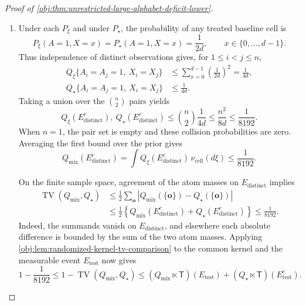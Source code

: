 \documentclass[11pt]{article}
\begin{document}
\begin{proof}[Proof of \cref{obj:thm:unrestricted-large-alphabet-deficit-lower}]
\begin{enumerate}
\item Under each \(P_\xi\) and under \(P_\star\), the probability of any treated baseline cell is
\[
P_\xi(A=1,X=x)=P_\star(A=1,X=x)=\frac1{2d},
\qquad x\in\{0,\ldots,d-1\}.
\]
Thus independence of distinct observations gives, for \(1\le i<j\le n\),
\[
\begin{aligned}
Q_\xi\{A_i=A_j=1,\ X_i=X_j\}
&\le
\sum_{x=0}^{d-1}\left(\frac1{2d}\right)^2
=\frac1{4d},
\\
Q_\star\{A_i=A_j=1,\ X_i=X_j\}
&\le\frac1{4d}.
\end{aligned}
\]
Taking a union over the \(\binom n2\) pairs yields
\[
Q_\xi(E_{\mathrm{distinct}}^c),
\ Q_\star(E_{\mathrm{distinct}}^c)
\le
\binom n2\frac1{4d}
\le\frac{n^2}{8d}
\le\frac1{8192}.
\]
When \(n=1\), the pair set is empty and these collision probabilities are zero. Averaging the first bound over the prior gives
\[
Q_{\mathrm{mix}}(E_{\mathrm{distinct}}^c)
=
\int Q_\xi(E_{\mathrm{distinct}}^c)\,
\nu_{\mathrm{cell}}(d\xi)
\le\frac1{8192}.
\]

On the finite sample space, agreement of the atom masses on
\(E_{\mathrm{distinct}}\) implies
\[
\begin{aligned}
\operatorname{TV}(Q_{\mathrm{mix}},Q_\star)
&\le
\frac12\sum_{\mathbf o}
\left|Q_{\mathrm{mix}}(\{\mathbf o\})
-Q_\star(\{\mathbf o\})\right|
\\
&\le
\frac12\left\{
Q_{\mathrm{mix}}(E_{\mathrm{distinct}}^c)
+Q_\star(E_{\mathrm{distinct}}^c)
\right\}
\le\frac1{8192}.
\end{aligned}
\]
Indeed, the summands vanish on \(E_{\mathrm{distinct}}\), and elsewhere each absolute difference is bounded by the sum of the two atom masses. Applying
\cref{obj:lem:randomized-kernel-tv-comparison} to the common kernel and the measurable event \(E_{\mathrm{test}}\) now gives
\[
1-\frac1{8192}
\le
1-\operatorname{TV}(Q_{\mathrm{mix}},Q_\star)
\le
(Q_{\mathrm{mix}}\ltimes\mathsf T)(E_{\mathrm{test}})
+
(Q_\star\ltimes\mathsf T)(E_{\mathrm{test}}^c).
\]


\end{enumerate}
\end{proof}
\end{document}
